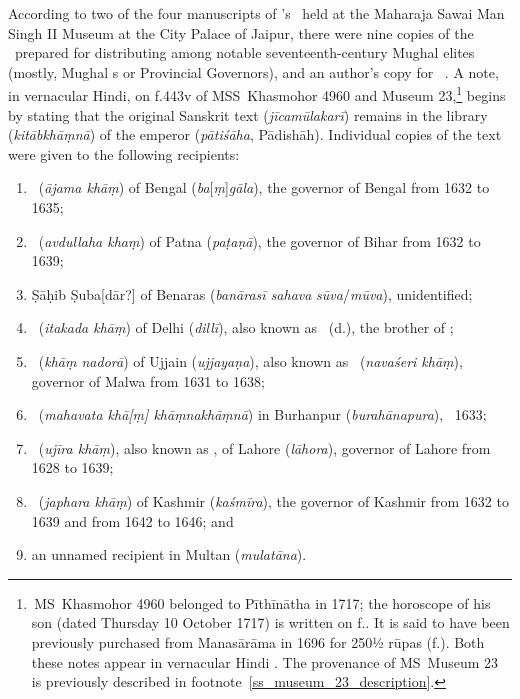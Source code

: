 According to two of the four manuscripts of \Nityananda's \Siddhantasindhu\ held at the Maharaja Sawai Man Singh II Museum at the City Palace of Jaipur, there were nine copies of the \Siddhantasindhu\ prepared for distributing among notable seventeenth-century Mughal elites (mostly, Mughal \Subadar s or Provincial Governors), and an author's copy for \Nityananda\ \parencite[142]{PingreeJaipur}. A note, in vernacular Hindi, on f.\thinspace 443v of MSS~Khasmohor 4960 and Museum 23,\footnote{\,MS~Khasmohor 4960 belonged to Pīthīnātha in 1717; the horoscope of his son (dated Thursday 10 October 1717) is written on f.. It is said to have been previously purchased from Manasārāma in 1696 for 250\thinspace ½ rūpas (f.). Both these notes appear in vernacular Hindi \parencite[138--142]{PingreeJaipur}. The provenance of MS~Museum 23 is previously described in footnote~\ref{ss_museum_23_description}.} begins by stating that the original Sanskrit text (\textit{jīcamūlakarī}) remains in the library (\textit{kitābkhāṃnā}) of the emperor (\textit{pātiśāha}, Pādishāh). Individual copies of the text were given to the following recipients:   
\begin{enumerate}[topsep=0pt]
    \item \AzamKhan\ (\textit{ājama khāṃ}) of Bengal (\textit{ba}[\textit{ṃ}]\textit{gāla}), the governor of Bengal from 1632 to 1635;
    \item \AbdallahKhanFiruzJung\ (\textit{avdullaha khaṃ}) of Patna (\textit{paṭaṇā}), the governor of Bihar from 1632 to 1639;
    \item Ṣāḥib Ṣuba[dār?] of Benaras (\textit{banārasī sahava} \textit{sūva}/\textit{mūva}), unidentified;
    \item \ItiqadKhan\ (\textit{itakada khāṃ}) of Delhi (\textit{dillī}), also known as \MirzaShapur\ (d.), the brother of \AsafKhanshort;
    \item \KhwajaSabirKhanDauran\ (\textit{khāṃ nadorā}) of Ujjain (\textit{ujjayaṇa}), also known as \NasiriKhan\ (\textit{navaśeri khāṃ}), governor of Malwa from
    1631 to 1638;
    \item \MahabatKhanKhaniKhanan\ (\textit{mahavata khā[ṃ] khāṃnakhāṃnā}) in Burhanpur (\textit{burahānapura}), \circa \post\ 1633;
     \item \VazirKhan\ (\textit{ujīra khāṃ}), also known as \HakimShaykhIlmalDinAnsari, of Lahore (\textit{lāhora}), governor of Lahore from 1628 to 1639;
     \item \ZafarKhanAhsan\ (\textit{japhara khāṃ}) of Kashmir (\textit{kaśmīra}), the governor of Kashmir from 1632 to 1639 and from 1642 to 1646; and
     \item an unnamed recipient in Multan (\textit{mulatāna}).
\end{enumerate}    


